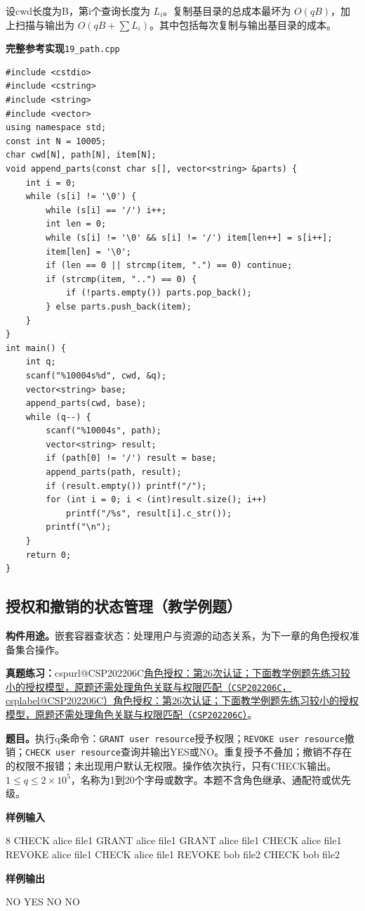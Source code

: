 \documentclass[UTF8,11pt,a4paper,fontset=none]{ctexart}
\makeatletter
\newcommand{\csp}[2]{\ifcsname cspurl@#1\endcsname\href{\csname cspurl@#1\endcsname}{#2（\texttt{#1}，\csname csplabel@#1\endcsname）}\else\href{https://oj.shumeng.tech/p/#1}{#2（\texttt{#1}）}\fi}
\newcommand{\ojpractice}[2]{\par\noindent\textbf{真题练习：}\csp{#1}{#2}。\par}
\makeatother
\begin{document}
设cwd长度为B，第i个查询长度为 $L_i$。复制基目录的总成本最坏为 $O(qB)$，加上扫描与输出为 $O(qB+\sum L_i)$。其中包括每次复制与输出基目录的成本。
\par\noindent\begin{minipage}{\linewidth}
\textbf{完整参考实现}\quad\texttt{19\_path.cpp}
\begin{lstlisting}
#include <cstdio>
#include <cstring>
#include <string>
#include <vector>
using namespace std;
const int N = 10005;
char cwd[N], path[N], item[N];
void append_parts(const char s[], vector<string> &parts) {
    int i = 0;
    while (s[i] != '\0') {
        while (s[i] == '/') i++;
        int len = 0;
        while (s[i] != '\0' && s[i] != '/') item[len++] = s[i++];
        item[len] = '\0';
        if (len == 0 || strcmp(item, ".") == 0) continue;
        if (strcmp(item, "..") == 0) {
            if (!parts.empty()) parts.pop_back();
        } else parts.push_back(item);
    }
}
int main() {
    int q;
    scanf("%10004s%d", cwd, &q);
    vector<string> base;
    append_parts(cwd, base);
    while (q--) {
        scanf("%10004s", path);
        vector<string> result;
        if (path[0] != '/') result = base;
        append_parts(path, result);
        if (result.empty()) printf("/");
        for (int i = 0; i < (int)result.size(); i++)
            printf("/%s", result[i].c_str());
        printf("\n");
    }
    return 0;
}
\end{lstlisting}
\end{minipage}\par


\subsection{授权和撤销的状态管理（教学例题）}
\noindent\textbf{构件用途。}嵌套容器查状态：处理用户与资源的动态关系，为下一章的角色授权准备集合操作。

\ojpractice{CSP202206C}{角色授权：第26次认证；下面教学例题先练习较小的授权模型，原题还需处理角色关联与权限匹配}

\noindent\textbf{题目。}执行q条命令：\texttt{GRANT user resource}授予权限；\texttt{REVOKE user resource}撤销；\texttt{CHECK user resource}查询并输出YES或NO。重复授予不叠加；撤销不存在的权限不报错；未出现用户默认无权限。操作依次执行，只有CHECK输出。$1\le q\le2\times10^5$，名称为1到20个字母或数字。本题不含角色继承、通配符或优先级。
\begin{tcolorbox}[samplebox,title={输入输出样例}]
\textbf{样例输入}
\begin{Sample}
8
CHECK alice file1
GRANT alice file1
GRANT alice file1
CHECK alice file1
REVOKE alice file1
CHECK alice file1
REVOKE bob file2
CHECK bob file2
\end{Sample}
\tcblower
\textbf{样例输出}
\begin{Sample}
NO
YES
NO
NO
\end{Sample}
\end{tcolorbox}
\end{document}
